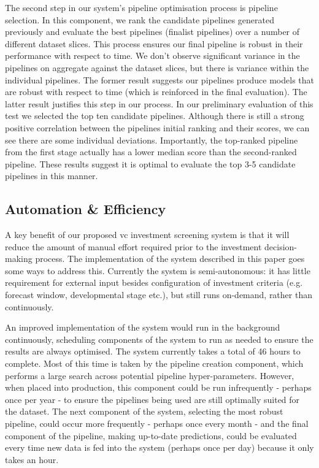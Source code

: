 \documentclass[../thesis/thesis.tex]{subfiles}
\begin{document}
The second step in our system's pipeline optimisation process is pipeline selection. In this component, we rank the candidate pipelines generated previously and evaluate the best pipelines (finalist pipelines) over a number of different dataset slices. This process ensures our final pipeline is robust in their performance with respect to time. We don't observe significant variance in the pipelines on aggregate against the dataset slices, but there is variance within the individual pipelines. The former result suggests our pipelines produce models that are robust with respect to time (which is reinforced in the final evaluation). The latter result justifies this step in our process. In our preliminary evaluation of this test we selected the top ten candidate pipelines. Although there is still a strong positive correlation between the pipelines initial ranking and their scores, we can see there are some individual deviations. Importantly, the top-ranked pipeline from the first stage actually has a lower median score than the second-ranked pipeline. These results suggest it is optimal to evaluate the top 3-5 candidate pipelines in this manner.

\subsection{Automation \& Efficiency}

A key benefit of our proposed \gls{vc} investment screening system is that it will reduce the amount of manual effort required prior to the investment decision-making process. The implementation of the system described in this paper goes some ways to address this. Currently the system is semi-autonomous: it has little requirement for external input besides configuration of investment criteria (e.g. forecast window, developmental stage etc.), but still runs on-demand, rather than continuously.

An improved implementation of the system would run in the background continuously, scheduling components of the system to run as needed to ensure the results are always optimised. The system currently takes a total of 46 hours to complete. Most of this time is taken by the pipeline creation component, which performs a large search across potential pipeline hyper-parameters. However, when placed into production, this component could be run infrequently - perhaps once per year - to ensure the pipelines being used are still optimally suited for the dataset. The next component of the system, selecting the most robust pipeline, could occur more frequently - perhaps once every month - and the final component of the pipeline, making up-to-date predictions, could be evaluated every time new data is fed into the system (perhaps once per day) because it only takes an hour.
\end{document}
